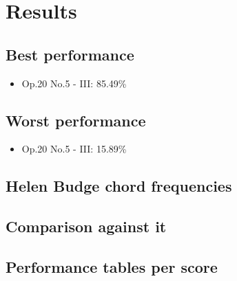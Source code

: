 \chapter{Results}

\section{Best performance}
\begin{itemize}
  \item Op.20 No.5 - III: 85.49\%
\end{itemize}
\section{Worst performance}
\begin{itemize}
  \item Op.20 No.5 - III: 15.89\%
\end{itemize}
\section{Helen Budge chord frequencies}
\section{Comparison against it}
\section{Performance tables per score}
\newpage
